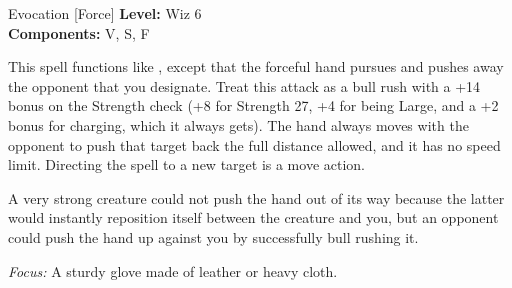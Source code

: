 {Evocation [Force]}
{
	\textbf{Level:}
	Wiz 6\\
	\textbf{Components:}
	V, S, F\\
}
{
	This spell functions like , except that the forceful hand pursues and pushes away the opponent that you designate. Treat this attack as a bull rush with a +14 bonus on the Strength check (+8 for Strength 27, +4 for being Large, and a +2 bonus for charging, which it always gets). The hand always moves with the opponent to push that target back the full distance allowed, and it has no speed limit. Directing the spell to a new target is a move action.

	A very strong creature could not push the hand out of its way because the latter would instantly reposition itself between the creature and you, but an opponent could push the hand up against you by successfully bull rushing it.

	\textit{Focus:}
	A sturdy glove made of leather or heavy cloth.

}
